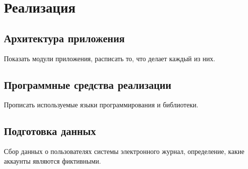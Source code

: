 \lstset{language=C, frame=L, basicstyle=\footnotesize,%
	keywordstyle=\bfseries, showstringspaces=false, xleftmargin=\parindent, numbers=none, numberstyle=\tiny, stepnumber=2, numbersep=5pt}
\newpage
\section{Реализация}

\subsection{Архитектура приложения}
\label{subsec:Architecture}
Показать модули приложения, расписать то, что делает каждый из них.

\vspace{1.5em}
\label{sec:Realisation}
\subsection{Программные средства реализации}
Прописать используемые языки программирования и библиотеки.

\vspace{1.5em}
\subsection{Подготовка данных}
\label{subsec:Preparation}
Сбор данных о пользователях системы электронного журнал, определение, какие аккаунты являются фиктивными.

\vspace{1.5em}
